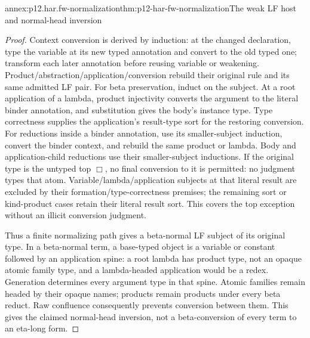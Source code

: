\begin{annexitem}{annex:p12.har.fw-normalization}{thm:p12-har-fw-normalization}{The weak LF host and normal-head inversion}
\begin{proof}
Context conversion is derived by induction: at the changed declaration,
type the variable at its new typed annotation and convert to the old
typed one; transform each later annotation before reusing variable or
weakening. Product/abstraction/application/conversion rebuild their
original rule and its same admitted LF pair. For beta preservation,
induct on the subject. At a root application of a lambda, product
injectivity converts the argument to the literal binder annotation,
and substitution gives the body's instance type. Type correctness
supplies the application's result-type sort for the restoring conversion.
For reductions inside a binder annotation, use its smaller-subject
induction, convert the binder context, and rebuild the same product or
lambda. Body and application-child reductions use their smaller-subject
inductions. If the original type is the untyped top \(\Box\),
no final conversion to it is permitted: no judgment types that atom.
Variable/lambda/application subjects at that literal result are excluded
by their formation/type-correctness premises; the remaining sort or
kind-product cases retain their literal result sort. This covers the
top exception without an illicit conversion judgment.

Thus a finite normalizing path gives a beta-normal LF subject of its
original type. In a beta-normal term, a base-typed object is a variable
or constant followed by an application spine: a root lambda has product
type, not an opaque atomic family type, and a lambda-headed application
would be a redex. Generation determines every argument type in that
spine. Atomic families remain headed by their opaque names; products
remain products under every beta reduct. Raw confluence consequently
prevents conversion between them. This gives the claimed normal-head
inversion, not a beta-conversion of every term to an eta-long form.
\end{proof}
\end{annexitem}

